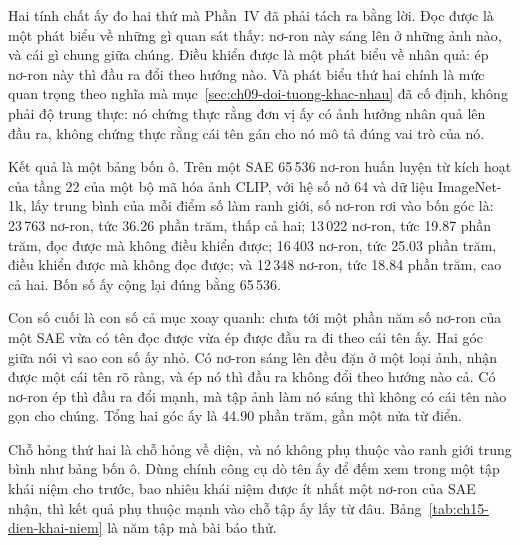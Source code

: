 %
Hai tính chất ấy đo hai thứ mà Phần~IV đã phải tách ra bằng lời. Đọc được là một
phát biểu về những gì quan sát thấy: nơ-ron này sáng lên ở những ảnh nào, và cái
gì chung giữa chúng. Điều khiển được là một phát biểu về nhân quả: ép nơ-ron này
thì đầu ra đổi theo hướng nào. Và phát biểu thứ hai chính là mức quan trọng theo
nghĩa mà mục~\ref{sec:ch09-doi-tuong-khac-nhau} đã cố định, không phải độ trung
thực: nó chứng thực rằng đơn vị ấy có ảnh hưởng nhân quả lên đầu ra, không chứng
thực rằng cái tên gán cho nó mô tả đúng vai trò của nó.

%
Kết quả là một bảng bốn ô. Trên một SAE 65\,536 nơ-ron huấn luyện từ kích hoạt
của tầng 22 của một bộ mã hóa ảnh CLIP, với hệ số nở 64 và dữ liệu ImageNet-1k,
lấy trung bình của mỗi điểm số làm ranh giới, số nơ-ron rơi vào bốn góc là:
23\,763 nơ-ron, tức 36.26 phần trăm, thấp cả hai; 13\,022 nơ-ron, tức 19.87 phần
trăm, đọc được mà không điều khiển được; 16\,403 nơ-ron, tức 25.03 phần trăm,
điều khiển được mà không đọc được; và 12\,348 nơ-ron, tức 18.84 phần trăm, cao
cả hai. Bốn số ấy cộng lại đúng bằng 65\,536.

Con số cuối là con số cả mục xoay quanh: chưa tới một phần năm số nơ-ron của
một SAE vừa có tên đọc được vừa ép được đầu ra đi theo cái tên ấy. Hai góc giữa
nói vì sao con số ấy nhỏ. Có nơ-ron sáng lên đều đặn ở một loại ảnh, nhận được
một cái tên rõ ràng, và ép nó thì đầu ra không đổi theo hướng nào cả. Có nơ-ron
ép thì đầu ra đổi mạnh, mà tập ảnh làm nó sáng thì không có cái tên nào gọn cho
chúng. Tổng hai góc ấy là 44.90 phần trăm, gần một nửa từ điển.

%
Chỗ hỏng thứ hai là chỗ hỏng về diện, và nó không phụ thuộc vào ranh giới trung
bình như bảng bốn ô. Dùng chính công cụ dò tên ấy để đếm xem trong một tập khái
niệm cho trước, bao nhiêu khái niệm được ít nhất một nơ-ron của SAE nhận, thì
kết quả phụ thuộc mạnh vào chỗ tập ấy lấy từ đâu. Bảng~\ref{tab:ch15-dien-khai-niem}
là năm tập mà bài báo thử.

